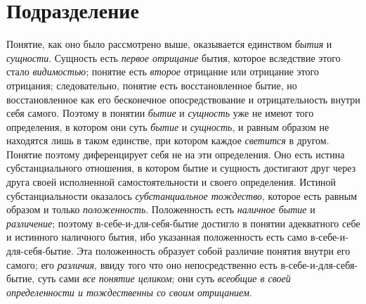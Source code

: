 \section[Подразделение]{Подразделение}
Понятие, как оно было рассмотрено выше, оказывается единством {\em бытия} и
{\em сущности}. Сущность есть {\em первое отрицание} бытия, которое вследствие
этого стало {\em видимостью}; понятие есть {\em второе}
отрицание или отрицание этого отрицания; следовательно,
понятие есть восстановленное бытие, но восстановленное как его бесконечное
опосредствование и отрицательность внутри себя самого. Поэтому в понятии
{\em бытие} и {\em сущность} уже не имеют того определения, в котором они суть
{\em бытие} и {\em сущность}, и равным образом не находятся лишь в таком
единстве, при котором каждое {\em светится} в другом.
Понятие поэтому диференцирует себя не на эти определения. Оно есть истина
субстанциального отношения, в котором бытие и сущность достигают друг через
друга своей исполненной самостоятельности и своего определения. Истиной
субстанциальности оказалось {\em субстанциальное тождество},
которое есть равным образом и только {\em положенность}.
Положенность есть {\em наличное бытие} и {\em различение}; поэтому
в-себе-и-для-себя-бытие достигло в понятии адекватного себе и истинного
наличного бытия, ибо указанная положенность есть само
в-себе-и-для-себя-бытие. Эта положенность образует собой различие понятия
внутри его самого; его {\em различия}, ввиду того что
оно
непосредственно есть в-себе-и-для-себя-бытие, суть сами
{\em все понятие целиком}; они суть {\em всеобщие в
своей определенности и тождественны со своим отрицанием}.

